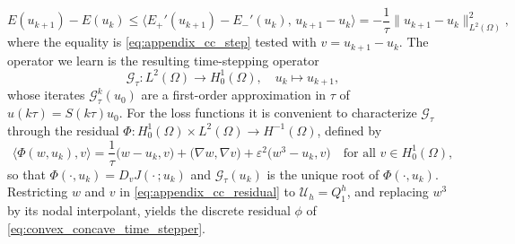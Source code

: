 \documentclass{article} %
\begin{document}
\begin{equation*}
   E(u_{k+1}) - E(u_k)
   \leq
   \big\langle E_+'(u_{k+1}) - E_-'(u_k),\, u_{k+1} - u_k \big\rangle
   =
   -\frac1\tau\|u_{k+1} - u_k\|^2_{L^2(\Omega)},
\end{equation*}
where the equality is \eqref{eq:appendix_cc_step} tested with $v = u_{k+1} - u_k$. The operator we learn is the resulting time-stepping operator
\begin{equation*}
   \mathcal G_\tau : L^2(\Omega) \to H^1_0(\Omega), \quad u_k \mapsto u_{k+1},
\end{equation*}
whose iterates $\mathcal G_\tau^k(u_0)$ are a first-order approximation in $\tau$ of $u(k\tau) = S(k\tau)u_0$. For the loss functions it is convenient to characterize $\mathcal G_\tau$ through the residual $\Phi : H^1_0(\Omega)\times L^2(\Omega) \to H^{-1}(\Omega)$, defined by
\begin{equation}\label{eq:appendix_cc_residual}
   \big\langle \Phi(w, u_k), v \big\rangle
   =
   \frac1\tau\big(w - u_k, v\big) + \big(\nabla w, \nabla v\big) + \varepsilon^2\big(w^3 - u_k, v\big)
   \quad \text{for all } v\in H^1_0(\Omega),
\end{equation}
so that $\Phi(\cdot, u_k) = D_v J(\cdot\,; u_k)$ and $\mathcal G_\tau(u_k)$ is the unique root of $\Phi(\cdot, u_k)$. Restricting $w$ and $v$ in \eqref{eq:appendix_cc_residual} to $\mathcal U_h = Q_1^h$, and replacing $w^3$ by its nodal interpolant, yields the discrete residual $\phi$ of \eqref{eq:convex_concave_time_stepper}.
\end{document}
